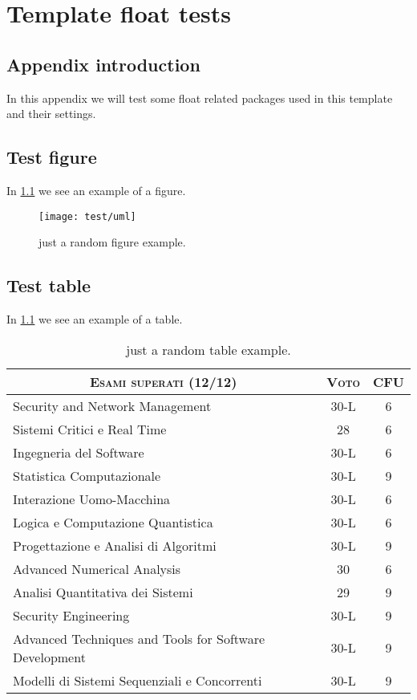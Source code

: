 \chapter{Template float tests}
\label{appendix:test}
\acresetall

\section{Appendix introduction}

In this appendix we will test some float related packages used in this template and their settings.

\section{Test figure}

In \cref{figure:uml} we see an example of a figure.

\begin{figure}[htbp]
\centering
\texttt{[image: test/uml]}
\caption[Figure example]{just a random figure example.}
\label{figure:uml}
\end{figure}

\section{Test table}

In \cref{table:esami} we see an example of a table.

\begin{table}[htbp]
\centering
\caption[Table example]{just a random table example.}
\label{table:esami}
\small
\begin{tabular}{lcc}
\toprule
\multicolumn{1}{c}{\textsc{Esami superati (12/12)}} & \textsc{Voto}&\textsc{CFU}\\ 
\midrule
Security and Network Management & 30-L & 6 \\
Sistemi Critici e Real Time & 28 & 6 \\
Ingegneria del Software & 30-L & 6 \\
Statistica Computazionale & 30-L & 9 \\
Interazione Uomo-Macchina & 30-L & 6 \\
Logica e Computazione Quantistica & 30-L & 6 \\
Progettazione e Analisi di Algoritmi & 30-L & 9 \\
Advanced Numerical Analysis & 30 & 6 \\
Analisi Quantitativa dei Sistemi & 29 & 9 \\
Security Engineering & 30-L & 9 \\
Advanced Techniques and Tools for Software Development & 30-L & 9 \\
Modelli di Sistemi Sequenziali e Concorrenti & 30-L & 9 \\
\bottomrule
\end{tabular}
\end{table}